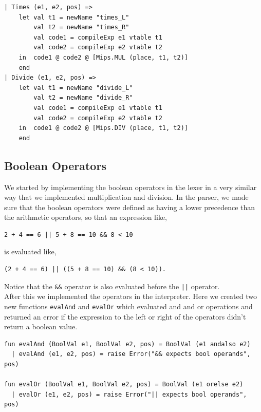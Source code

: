\documentclass[11pt]{article}
\begin{document}
    \begin{lstlisting}[basicstyle=\small]
| Times (e1, e2, pos) =>
    let val t1 = newName "times_L"
        val t2 = newName "times_R"
        val code1 = compileExp e1 vtable t1
        val code2 = compileExp e2 vtable t2
    in  code1 @ code2 @ [Mips.MUL (place, t1, t2)]
    end
| Divide (e1, e2, pos) =>
    let val t1 = newName "divide_L"
        val t2 = newName "divide_R"
        val code1 = compileExp e1 vtable t1
        val code2 = compileExp e2 vtable t2
    in  code1 @ code2 @ [Mips.DIV (place, t1, t2)]
    end
    \end{lstlisting}

    \subsection{Boolean Operators}
    We started by implementing the boolean operators in the lexer in a very
    similar way that we implemented multiplication and division.  In the parser,
    we made sure that the boolean operators were defined as having a lower
    precedence than the arithmetic operators, so that an expression like,

    \begin{lstlisting}[basicstyle=\small]
        2 + 4 == 6 || 5 + 8 == 10 && 8 < 10
    \end{lstlisting}

    is evaluated like,

    \begin{lstlisting}[basicstyle=\small]
        (2 + 4 == 6) || ((5 + 8 == 10) && (8 < 10)).
    \end{lstlisting}

    Notice that the \texttt{\&\&} operator is also evaluated before the
    \texttt{||} operator. \\

    After this we implemented the operators in the interpreter.  Here we created
    two new functions \texttt{evalAnd} and \texttt{evalOr} which evaluated and
    and or operations and returned an error if the expression to the left or
    right of the operators didn't return a boolean value.

    \begin{lstlisting}[basicstyle=\small]
fun evalAnd (BoolVal e1, BoolVal e2, pos) = BoolVal (e1 andalso e2)
  | evalAnd (e1, e2, pos) = raise Error("&& expects bool operands", pos)

fun evalOr (BoolVal e1, BoolVal e2, pos) = BoolVal (e1 orelse e2)
  | evalOr (e1, e2, pos) = raise Error("|| expects bool operands", pos)
    \end{lstlisting}
\end{document}
